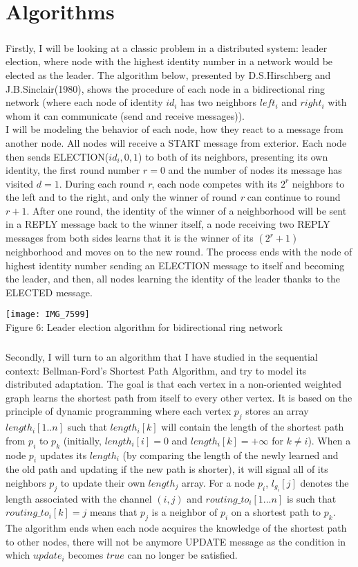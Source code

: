 \documentclass{article}
\begin{document}
	\section{Algorithms}
	\subparagraph{}Firstly, I will be looking at a classic problem in a distributed system: leader election, where node with the highest identity number in a network would be elected as the leader. The algorithm below, presented by D.S.Hirschberg and J.B.Sinclair(1980), shows the procedure of each node in a bidirectional ring network (where each node of identity $id_{i}$ has two neighbors $left_{i}$ and $right_{i}$ with whom it can communicate (send and receive messages)). 
	\\I will be modeling the behavior of each node, how they react to a message from another node. All nodes will receive a START message from exterior. Each node then sends ELECTION($id_{i},0,1$) to both of its neighbors, presenting its own identity, the first round number $r=0$ and the number of nodes its message has visited $d=1$. During each round \textit{r}, each node competes with its $2^{\mathit{r}}$ neighbors to the left and to the right, and only the winner of round \textit{r} can continue to round $\mathit{r}+1$. After one round, the identity of the winner of a neighborhood will be sent in a REPLY message back to the winner itself, a node receiving two REPLY messages from both sides learns that it is the winner of its $(2^{r}+1)$ neighborhood and moves on to the new round. The process ends with the node of highest identity number sending an ELECTION message to itself and becoming the leader, and then, all nodes learning the identity of the leader thanks to the ELECTED message.
		\begin{center}
			\texttt{[image: IMG\_7599]}
			\\Figure 6: Leader election algorithm for bidirectional ring network			
		\end{center}
	\subparagraph{}Secondly, I will turn to an algorithm that I have studied in the sequential context: Bellman-Ford's Shortest Path Algorithm, and try to model its distributed adaptation. The goal is that each vertex in a non-oriented weighted graph learns the shortest path from itself to every other vertex. It is based on the principle of dynamic programming where each vertex $p_{j}$ stores an array $length_{i}[1..n]$ such that $length_{i}[k]$ will contain the length of the shortest path from $p_{i}$ to $p_{k}$ (initially, $length_{i}[i]=0$ and $length_{i}[k]=+\infty$ for $k \neq i$). When a node $p_{i}$ updates its $length_{i}$ (by comparing the length of the newly learned and the old path and updating if the new path is shorter), it will signal all of its neighbors $p_{j}$ to update their own $length_{j}$ array. For a node $p_{i}$, $l_{g_{i}}[j]$ denotes the length associated with the channel $(i,j)$ and $routing\_to_{i}[1...n]$ is such that $routing\_to_{i}[k]=j$ means that $p_{j}$ is a neighbor of $p_{i}$ on a shortest path to $p_{k}$. The algorithm ends when each node acquires the knowledge of the shortest path to other nodes, there will not be anymore UPDATE message as the condition in which $update_{i}$ becomes $true$ can no longer be satisfied.
\end{document}
